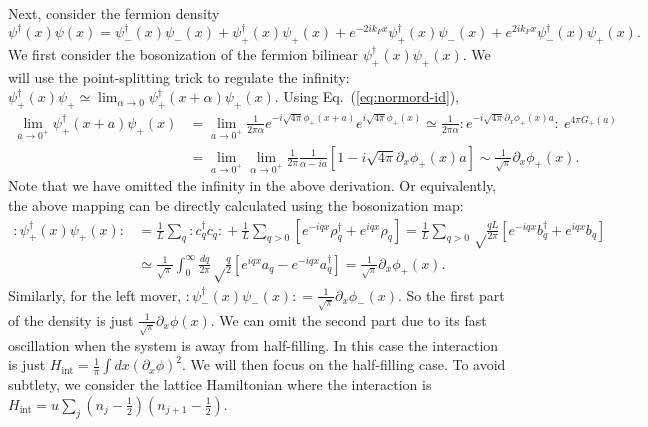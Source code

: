 \documentclass[aps,prb,superscriptaddress,nofootinbib]{revtex4}
\newcommand{\normord}[1]{{:\mathrel{#1}:}}
\begin{document}
Next, consider the fermion density
\begin{equation*}
	\psi^\dagger(x)\psi(x) = \psi_-^\dagger(x)\psi_-(x) + \psi_+^\dagger(x)\psi_+(x) + e^{-2ik_F x} \psi_+^\dagger(x)\psi_-(x)+e^{2ik_F x}\psi_-^\dagger(x)\psi_+(x).
\end{equation*}
We first consider the bosonization of the fermion bilinear $\psi_+^\dagger(x)\psi_+(x)$.
We will use the point-splitting trick to regulate the infinity: $\psi^\dagger_+(x)\psi_+ \simeq \lim_{\alpha\rightarrow 0} \psi_+^\dagger(x+\alpha)\psi_+(x)$.
Using Eq.~(\ref{eq:normord-id}), 
\begin{equation*}
\begin{aligned}
	\lim_{a\rightarrow 0^+}\psi_+^\dagger(x+a)\psi_+(x)
	&= \lim_{a\rightarrow 0^+}\frac{1}{2\pi \alpha} e^{-i\sqrt{4\pi}\phi_+(x+a)}e^{i\sqrt{4\pi}\phi_+(x)} 
	\simeq \frac{1}{2\pi \alpha} \normord{e^{-i\sqrt{4\pi}\partial_x\phi_+(x)a}} \ e^{4\pi G_+(a)} \\
	&= \lim_{a\rightarrow 0^+}\lim_{\alpha\rightarrow 0^+}\frac{1}{2\pi} \frac{1}{\alpha-ia} \left[1-i\sqrt{4\pi}\partial_x\phi_+(x)a \right]
	\sim \frac{1}{\sqrt\pi} \partial_x\phi_+(x).
\end{aligned}
\end{equation*}
Note that we have omitted the infinity in the above derivation.
Or equivalently, the above mapping can be directly calculated using the bosonization map:
\begin{equation*}
\begin{aligned}
	\normord{\psi_+^\dagger(x)\psi_+(x)}
	&= \frac{1}{L}\sum_{q} {:\mathrel{c_{q}^\dagger c_{q}}:} + \frac{1}{L}\sum_{q>0}[e^{-iqx}\rho^\dagger_{q}+e^{iqx}\rho_{q}]
	= \frac{1}{L}\sum_{q>0} \sqrt\frac{qL}{2\pi} [e^{-iqx}b^\dagger_{q}+e^{iqx}b_{q}] \\
	&\simeq \frac{1}{\sqrt{\pi}} \int_0^\infty \frac{dq}{2\pi} \sqrt\frac{q}{2} \left[e^{iqx}a_{q} - e^{-iqx}a^\dagger_{q}\right] 
	= \frac{1}{\sqrt\pi} \partial_x\phi_+(x).
\end{aligned}
\end{equation*}
Similarly, for the left mover, $\normord{\psi_-^\dagger(x)\psi_-(x)}= \frac{1}{\sqrt\pi} \partial_x\phi_-(x)$.
So the first part of the density is just $\frac{1}{\sqrt\pi}\partial_x\phi(x)$.
We can omit the second part due to its fast oscillation when the system is away from half-filling.
In this case the interaction is just $H_\text{int} = \frac{1}{\pi}\int dx (\partial_x\phi)^2$.
We will then focus on the half-filling case.
To avoid subtlety, we consider the lattice Hamiltonian where the interaction is $H_\text{int} = u \sum_j \left(n_j-\frac{1}{2}\right) \left(n_{j+1}-\frac{1}{2} \right)$.
\end{document}
